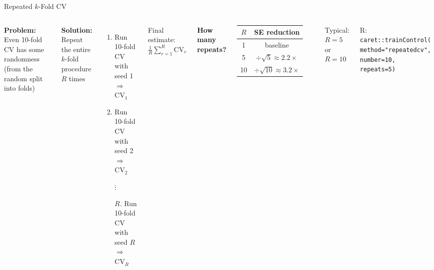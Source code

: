 \documentclass[aspectratio=169, 11pt]{beamer}
\begin{document}
\begin{frame}{Repeated $k$-Fold CV}
\begin{columns}
\textbf{Problem:} Even 10-fold CV has some randomness (from the random split into folds)

\vspace{0.3em}
\textbf{Solution:} Repeat the entire $k$-fold procedure $R$ times

\begin{enumerate}
  \item Run 10-fold CV with seed 1 $\Rightarrow$ CV$_1$
  \item Run 10-fold CV with seed 2 $\Rightarrow$ CV$_2$
  \item[] $\vdots$
  \item[$R$.] Run 10-fold CV with seed $R$ $\Rightarrow$ CV$_R$
\end{enumerate}

Final estimate: $\frac{1}{R}\sum_{r=1}^{R} \text{CV}_r$

\textbf{How many repeats?}

\begin{tabular}{cc}
\toprule
$R$ & SE reduction \\
\midrule
1 & baseline \\
5 & $\div \sqrt{5} \approx 2.2\times$ \\
10 & $\div \sqrt{10} \approx 3.2\times$ \\
\bottomrule
\end{tabular}

\vspace{0.5em}
Typical: $R = 5$ or $R = 10$

\vspace{0.3em}
\footnotesize R: \texttt{caret::trainControl(}\\
\texttt{\quad method="repeatedcv",}\\
\texttt{\quad number=10, repeats=5)}
\end{columns}
\end{frame}
\end{document}
